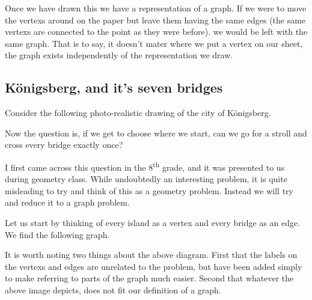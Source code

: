 \documentclass{article}
\begin{document}
Once we have drawn this we have a representation of a \gls{graph}. If we were to move the \glspl{vertex} around on the paper but leave them having the same \glspl{edge} (the same \glspl{vertex} are connected to the point as they were before). we would be left with the same \gls{graph}. That is to say, it doesn't mater where we put a \gls{vertex} on our sheet, the \gls{graph} exists independently of the representation we draw.

\subsection{K\"onigsberg, and it's seven bridges}

Consider the following photo-realistic drawing of the city of K\"onigsberg.



Now the question is, if we get to choose where we start, can we go for a stroll and cross every bridge exactly once?

I first came across this question in the 8\textsuperscript{th} grade, and it was presented to us during geometry class. While undoubtedly an interesting problem, it is quite misleading to try and think of this as a geometry problem. Instead we will try and reduce it to a \gls{graph} problem.

Let us start by thinking of every island as a \gls{vertex} and every bridge as an \gls{edge}. We find the following \gls{graph}.

\begin{center}
\end{center}

It is worth noting two things about the above diagram. First that the labels on the \glspl{vertex} and \glspl{edge} are unrelated to the problem, but have been added simply to make referring to parts of the \gls{graph} much easier. Second that whatever the above image depicts, does not fit our definition of a \gls{graph}.
\end{document}
